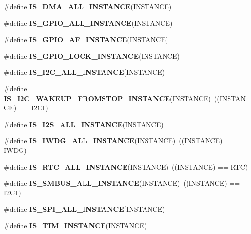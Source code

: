 \begin{DoxyCompactItemize}
\#define {\bfseries I\+S\+\_\+\+D\+M\+A\+\_\+\+A\+L\+L\+\_\+\+I\+N\+S\+T\+A\+N\+CE}(I\+N\+S\+T\+A\+N\+CE)
\item 
\#define {\bfseries I\+S\+\_\+\+G\+P\+I\+O\+\_\+\+A\+L\+L\+\_\+\+I\+N\+S\+T\+A\+N\+CE}(I\+N\+S\+T\+A\+N\+CE)
\item 
\#define {\bfseries I\+S\+\_\+\+G\+P\+I\+O\+\_\+\+A\+F\+\_\+\+I\+N\+S\+T\+A\+N\+CE}(I\+N\+S\+T\+A\+N\+CE)
\item 
\#define {\bfseries I\+S\+\_\+\+G\+P\+I\+O\+\_\+\+L\+O\+C\+K\+\_\+\+I\+N\+S\+T\+A\+N\+CE}(I\+N\+S\+T\+A\+N\+CE)
\item 
\#define {\bfseries I\+S\+\_\+\+I2\+C\+\_\+\+A\+L\+L\+\_\+\+I\+N\+S\+T\+A\+N\+CE}(I\+N\+S\+T\+A\+N\+CE)
\item 
\mbox{\label{group___exported__macro_gadf692bda16bac3264bccff7f59ddaab9}} 
\#define {\bfseries I\+S\+\_\+\+I2\+C\+\_\+\+W\+A\+K\+E\+U\+P\+\_\+\+F\+R\+O\+M\+S\+T\+O\+P\+\_\+\+I\+N\+S\+T\+A\+N\+CE}(I\+N\+S\+T\+A\+N\+CE)~((I\+N\+S\+T\+A\+N\+CE) == I2\+C1)
\item 
\#define {\bfseries I\+S\+\_\+\+I2\+S\+\_\+\+A\+L\+L\+\_\+\+I\+N\+S\+T\+A\+N\+CE}(I\+N\+S\+T\+A\+N\+CE)
\item 
\mbox{\label{group___exported__macro_gad9ec4c52f0572ee67d043e006f1d5e39}} 
\#define {\bfseries I\+S\+\_\+\+I\+W\+D\+G\+\_\+\+A\+L\+L\+\_\+\+I\+N\+S\+T\+A\+N\+CE}(I\+N\+S\+T\+A\+N\+CE)~((I\+N\+S\+T\+A\+N\+CE) == I\+W\+DG)
\item 
\mbox{\label{group___exported__macro_gab4230e8bd4d88adc4250f041d67375ce}} 
\#define {\bfseries I\+S\+\_\+\+R\+T\+C\+\_\+\+A\+L\+L\+\_\+\+I\+N\+S\+T\+A\+N\+CE}(I\+N\+S\+T\+A\+N\+CE)~((I\+N\+S\+T\+A\+N\+CE) == R\+TC)
\item 
\mbox{\label{group___exported__macro_gaf492fcfe71eab8d1dadf4d837b840af6}} 
\#define {\bfseries I\+S\+\_\+\+S\+M\+B\+U\+S\+\_\+\+A\+L\+L\+\_\+\+I\+N\+S\+T\+A\+N\+CE}(I\+N\+S\+T\+A\+N\+CE)~((I\+N\+S\+T\+A\+N\+CE) == I2\+C1)
\item 
\#define {\bfseries I\+S\+\_\+\+S\+P\+I\+\_\+\+A\+L\+L\+\_\+\+I\+N\+S\+T\+A\+N\+CE}(I\+N\+S\+T\+A\+N\+CE)
\item 
\#define {\bfseries I\+S\+\_\+\+T\+I\+M\+\_\+\+I\+N\+S\+T\+A\+N\+CE}(I\+N\+S\+T\+A\+N\+CE)
\item 

\end{DoxyCompactItemize}
